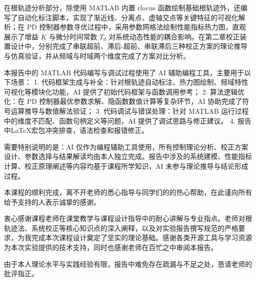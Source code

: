 \documentclass[a4paper]{ctexbook}
\begin{document}
在根轨迹分析部分，除使用 MATLAB 内置 rlocus 函数绘制基础根轨迹外，还编写了自动化标注脚本，实现了渐近线、分离点、虚轴交点等关键特征的可视化解析；在 PD 控制器参数寻优过程中，采用参数网格法绘制性能指标热力图，直观展示了增益 $K$ 与微分时间常数 $T_d$ 对系统动态性能的耦合影响。在第二章校正装置设计中，分别完成了串联超前、滞后-超前、串联滞后三种校正方案的理论推导与仿真验证，并从频域与时域两个维度完成了方案对比分析。

本报告中的 MATLAB 代码编写与调试过程使用了 AI 辅助编程工具，主要用于以下场景：
1. 代码框架生成与补全：针对根轨迹自动标注、热力图绘制、频域特性可视化等模块化功能，AI 提供了初始代码框架与函数调用参考；
2. 算法逻辑优化：在 PD 控制器最优参数求解、隐函数数值计算等复杂环节，AI 协助完成了符号运算推导与数值解法验证；
3. 代码调试与错误处理：针对 MATLAB 运行过程中的维度不匹配、函数句柄定义等问题，AI 提供了调试思路与修正建议。
4. 报告中\LaTeX 宏包冲突排查，语法检查和报错修正。

需要特别说明的是：AI 仅作为编程辅助工具使用，所有控制理论分析、校正方案设计、参数选择与结果解读均由本人独立完成。报告中涉及的系统建模、性能指标计算、校正原理阐述等内容均基于课程所学知识，AI 未参与理论推导与结论形成过程。

本课程的顺利完成，离不开老师的悉心指导与同学们的的热心帮助，在此谨向所有给予支持的人表示诚挚的感谢。

衷心感谢课程老师在课堂教学与课程设计指导中的耐心讲解与专业指点。老师对根轨迹法、系统校正等核心知识点的深入阐释，以及对实验报告撰写规范的严格要求，为我完成本次课程设计奠定了坚实的理论基础。感谢各类开源工具与学习资源为本次实验提供的技术支持，同时也感谢老师在百忙之中审阅本报告。

由于本人理论水平与实践经验有限，报告中难免存在疏漏与不足之处，恳请老师的批评指正。
\clearpage
\end{document}
